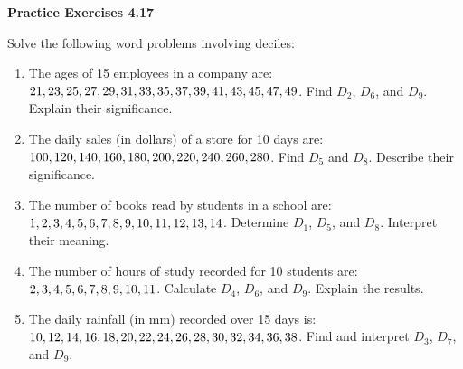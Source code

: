 \vspace{0.3ex}
\noindent\textbf{Practice Exercises 4.17}

\vspace{0.2ex}

Solve the following word problems involving deciles:  

\begin{enumerate}
    \item The ages of 15 employees in a company are: \(21, 23, 25, 27, 29, 31, 33, 35, 37,\\ 39, 41, 43, 45, 47, 49\). Find \(D_2\), \(D_6\), and \(D_9\). Explain their significance.  
    \item The daily sales (in dollars) of a store for 10 days are: \(100, 120, 140, 160, 180,\\ 200, 220, 240, 260, 280\). Find \(D_5\) and \(D_8\). Describe their significance.  
    \item The number of books read by students in a school are: \(1, 2, 3, 4, 5, 6, 7, 8, 9, 10,\\ 11, 12, 13, 14\). Determine \(D_1\), \(D_5\), and \(D_8\). Interpret their meaning.  
    \item The number of hours of study recorded for 10 students are: \(2, 3, 4, 5, 6, 7, 8, 9,\\ 10, 11\). Calculate \(D_4\), \(D_6\), and \(D_9\). Explain the results.  
    \item The daily rainfall (in mm) recorded over 15 days is: \(10, 12, 14, 16, 18, 20, 22,\\ 24, 26, 28, 30, 32, 34, 36, 38\). Find and interpret \(D_3\), \(D_7\), and \(D_9\). %
\end{enumerate}
